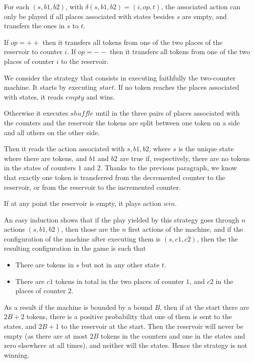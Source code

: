 \documentclass{article}
\begin{document}
For each $(s, b1, b2)$, with $\delta(s, b1, b2) = (i, op, t)$, the associated action can only be played if all places associated with states besides $s$ are empty, and transfers the ones in $s$ to $t$.

If $op = ++$ then it transfers all tokens from one of the two places of the reservoir to counter $i$.
If $op = --$ then it transfers all tokens from one of the two places of counter $i$ to the reservoir.

We consider the strategy that consists in executing faithfully the two-counter machine. It starts by executing $start$. If no token reaches the places associated with states, it reads $empty$ and wins.

Otherwise it executes $shuffle$ until in the three pairs of places associated with the counters and the reservoir the tokens are split between one token on a side and all others on the other side.

Then it reads the action associated with $s, b1, b2$, where $s$ is the unique state where there are tokens, and $b1$ and $b2$ are true if, respectively, there are no tokens in the states of counters $1$ and $2$. Thanks to the previous paragraph, we know that exactly one token is transferred from the decremented counter to the reservoir, or from the reservoir to the incremented counter.

If at any point the reservoir is empty, it plays action $win$.

An easy induction shows that if the play yielded by this strategy goes through $n$ actions $(s,b1, b2)$, then those are the $n$ first actions of the machine, and if the configuration of the machine after executing them is $(s, c1, c2)$, then the the resulting configuration in the game is such that 
\begin{itemize}
	\item There are tokens in $s$ but not in any other state $t$.
	
	\item There are $c1$ tokens in total in the two places of counter $1$, and $c2$ in the places of counter $2$.
\end{itemize}

As a result if the machine is bounded by a bound $B$, then if at the start there are $2B + 2$ tokens, there is a positive probability that one of them is sent to the states, and $2B+1$ to the reservoir at the start. Then the reservoir will never be empty (as there are at most $2B$ tokens in the counters and one in the states and zero elsewhere at all times), and neither will the states. Hence the strategy is not winning.
\end{document}
